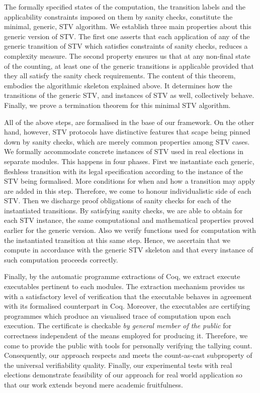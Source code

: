 \documentclass{llncs}
\begin{document}
The formally specified states of the computation, the transition labels and the applicability constraints imposed on them by sanity checks, constitute the minimal, generic, STV algorithm. We establish three  main properties about this generic version of STV. The first one asserts that each application of any of the generic transition of STV which satisfies constraints of sanity checks, reduces a complexity measure. The second property ensures us that at any non-final state of the counting, at least one of the generic transitions is applicable provided that they all satisfy the sanity check requirements. The content of this theorem, embodies the algorithmic skeleton explained above. It determines how the transitions of the generic STV, and instances of STV as well,  collectively behave. Finally, we prove a termination theorem for this minimal STV algorithm.


 All of the above steps, are formalised in the base of our framework. On the other hand, however, STV protocols have distinctive features that scape being pinned down by sanity checks, which are merely common properties among STV cases. We formally accommodate concrete instances of STV used in real elections in separate modules.  This happens in four phases.  First we instantiate each generic, fleshless transition with its legal specification according to the instance of the STV being formalised. More conditions for when and how a transition may apply are added in this step. Therefore, we come to honour individualistic side of each STV. Then we discharge proof obligations of sanity checks for each of the instantiated transitions. By satisfying sanity checks, we are able to obtain for each STV instance, the same computational and mathematical properties proved earlier for the generic version. Also we verify functions used for computation with the instantiated transition at this same step. Hence, we ascertain that we compute in accordance with the generic STV skeleton and that every instance of such computation proceeds correctly.
 
 
Finally, by the automatic programme extractions of Coq, we extract execute executables pertinent to each modules. The extraction mechanism provides us with a satisfactory level of verification that the executable behaves in agreement with its formalised counterpart in Coq. Moreover, the executables are certifying programmes which produce an visualised trace of computation upon each execution. The certificate is checkable \emph{by general member of the public} for correctness independent of the means employed for producing it. Therefore, we come to provide the public with tools for personally verifying the tallying count. Consequently, our approach respects and meets the count-as-cast subproperty of the universal verifiability quality. Finally, our experimental tests with real elections demonstrate feasibility of our approach for  real world application so that our work extends beyond mere academic fruitfulness. 
 
\end{document}
